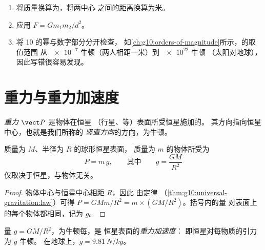 \begin{method}[计算万有引力]\label{met:g10:universal-gravitation:compute}
\begin{enumerate}
  \item 将质量换算为，将两中心
        之间的距离换算为米。
  \item 应用 $F = G m_1 m_2 / d^2$。
  \item 将 10 的幂与数字部分分开检查，
        如\cref{ch:g10:orders-of-magnitude}所示，的取值范围
        从 $\num{e-7}$ 牛顿（两人相距一米）到 $\num{e22}$ 牛顿
        （太阳对地球），因此写错很容易发现。
\end{enumerate}
\end{method}

\section{重力与重力加速度}

\begin{definition}[重力]\label{def:g10:universal-gravitation:weight}
\emph{重力} $\vect P$ 是物体在恒星
（行星、等）表面所受恒星施加的。
其方向指向恒星中心，也就是我们所称的
\emph{竖直方向}的方向，为牛顿。
\end{definition}

\begin{proposition}[恒星表面的重力]\label{prop:g10:universal-gravitation:surfaceg}
质量为 $M$、半径为 $R$ 的球形恒星表面，
质量为 $m$ 的物体所受为
\[
P = m\,g,
\qquad\text{其中}\qquad
g = \frac{G M}{R^2}
\]
仅取决于恒星，与物体无关。
\end{proposition}

\begin{proof}
物体中心与恒星中心相距 $R$，因此
由定律
（\cref{thm:g10:universal-gravitation:law}）可得
$P = G M m / R^2 = m \times \left(G M / R^2\right)$。括号内的量
对表面上的每个物体都相同，记为 $g$。
\end{proof}

\begin{definition}[重力加速度]\label{def:g10:universal-gravitation:fieldstrength}
量 $g = G M / R^2$，为牛顿每，是
恒星表面的\emph{重力加速度}：
即恒星对每物质的引力为 $g$ 牛顿。
在地球上，$g = \qty{9.81}{N/kg}$。
\end{definition}

